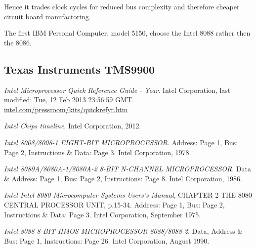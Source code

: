 \documentclass[twoside,twocolumn]{article}
\begin{document}
Hence it trades clock cycles for reduced bus complexity and therefore cheaper circuit
board manufactoring.

The first IBM Personal Computer, model 5150, choose the Intel 8088 rather then the 8086.

\subsection{Texas Instruments TMS9900}


\begin{thebibliography}{99} %

\textit{Intel Microprocessor Quick Reference Guide - Year}.
Intel Corporation, last modified: Tue, 12 Feb 2013 23:56:59 GMT.
\href{https://www.intel.com/pressroom/kits/quickrefyr.htm}{intel.com/pressroom/kits/quickrefyr.htm}

\textit{Intel Chips timeline}.
Intel Corporation, 2012.

\textit{Intel 8008/8008-1 EIGHT-BIT MICROPROCESSOR}.
Address: Page 1, Bus: Page 2, Instructions \& Data: Page 3.
Intel Corporation, 1978.

\textit{Intel 8080A/8080A-1/8080A-2 8-BIT N-CHANNEL MICROPROCESSOR}.
Data \& Address: Page 1, Bus: Page 2, Instructions: Page 8.
Intel Corporation, 1986.

\textit{Intel Intel 8080 Microcomputer Systems Users's Manual}, CHAPTER 2 THE 8080 CENTRAL PROCESSOR UNIT, p.15-34.
Address: Page 1, Bus: Page 2, Instructions \& Data: Page 3.
Intel Corporation, September 1975.

\textit{Intel 8088 8-BIT HMOS MICROPROCESSOR 8088/8088-2}.
Data, Address \& Bus: Page 1, Instructions: Page 26.
Intel Corporation, August 1990.

\end{thebibliography}

\end{document}
